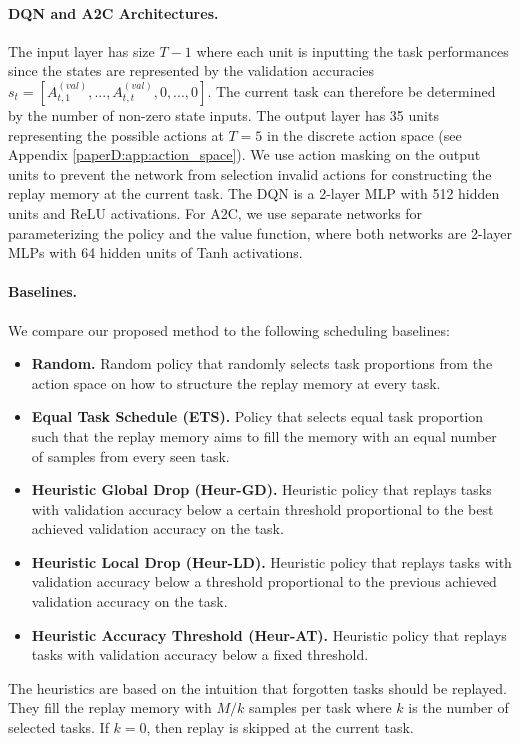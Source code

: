 \vspace{-3mm}
\paragraph{DQN and A2C Architectures.}
The input layer has size $T-1$ where each unit is inputting the task performances since the states are represented by the validation accuracies $s_t = [A_{t, 1}^{(val)}, ..., A_{t, t}^{(val)}, 0, ..., 0]$. The current task can therefore be determined by the number of non-zero state inputs. The output layer has 35 units representing the possible actions at $T=5$ in the discrete action space (see Appendix \ref{paperD:app:action_space}). We use action masking on the output units to prevent the network from selection invalid actions for constructing the replay memory at the current task. The DQN is a 2-layer MLP with 512 hidden units and ReLU activations. For A2C, we use separate networks for parameterizing the policy and the value function, where both networks are 2-layer MLPs with 64 hidden units of Tanh activations. 

\vspace{-3mm}
\paragraph{Baselines.} We compare our proposed method to the following scheduling baselines: 
\begin{itemize}[topsep=0pt]%
	\item {\bf Random.} Random policy that randomly selects task proportions from the action space on how to structure the replay memory at every task. 
	\item {\bf Equal Task Schedule (ETS).} Policy that selects equal task proportion such that the replay memory aims to fill the memory with an equal number of samples from every seen task. 
	\item {\bf Heuristic Global Drop (Heur-GD).} Heuristic policy that replays tasks with validation accuracy below a certain threshold proportional to the best achieved validation accuracy on the task.
	\item {\bf Heuristic Local Drop (Heur-LD).} Heuristic policy that replays tasks with validation accuracy below a threshold proportional to the previous achieved validation accuracy on the task. 
	\item {\bf Heuristic Accuracy Threshold (Heur-AT).} Heuristic policy that replays tasks with validation accuracy below a fixed threshold. 
\end{itemize}
The heuristics are based on the intuition that forgotten tasks should be replayed. They fill the replay memory with $M/k$ samples per task where $k$ is the number of selected tasks. If $k=0$, then replay is skipped at the current task. 

